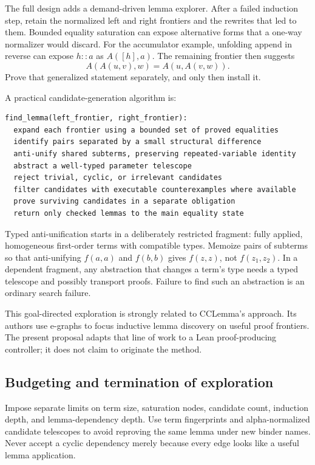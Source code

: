 The full design adds a demand-driven lemma explorer. After a failed induction
step, retain the normalized left and right frontiers and the rewrites that
led to them. Bounded equality saturation can expose alternative forms that a
one-way normalizer would discard. For the accumulator example, unfolding
append in reverse can expose $h::a$ as $A([h],a)$. The remaining frontier then
suggests
\[
A(A(u,v),w)=A(u,A(v,w)).
\]
Prove that generalized statement separately, and only then install it.

A practical candidate-generation algorithm is:
\begin{lstlisting}
find_lemma(left_frontier, right_frontier):
  expand each frontier using a bounded set of proved equalities
  identify pairs separated by a small structural difference
  anti-unify shared subterms, preserving repeated-variable identity
  abstract a well-typed parameter telescope
  reject trivial, cyclic, or irrelevant candidates
  filter candidates with executable counterexamples where available
  prove surviving candidates in a separate obligation
  return only checked lemmas to the main equality state
\end{lstlisting}

Typed anti-unification starts in a deliberately restricted fragment:
fully applied, homogeneous first-order terms with compatible types. Memoize
pairs of subterms so that anti-unifying $f(a,a)$ and $f(b,b)$ gives $f(z,z)$,
not $f(z_1,z_2)$. In a dependent fragment, any abstraction that changes a term's
type needs a typed telescope and possibly transport proofs. Failure to find
such an abstraction is an ordinary search failure.

This goal-directed exploration is strongly related to CCLemma's approach.
Its authors use e-graphs to focus inductive lemma discovery on useful proof
frontiers. The present proposal adapts that line of work to a Lean
proof-producing controller; it does not claim to originate the method.
\cite{cclemma}

\subsection{Budgeting and termination of exploration}

Impose separate limits on term size, saturation nodes, candidate count,
induction depth, and lemma-dependency depth. Use term fingerprints and
alpha-normalized candidate telescopes to avoid reproving the same lemma under
new binder names. Never accept a cyclic dependency merely because every edge
looks like a useful lemma application.

